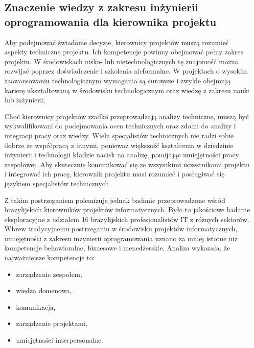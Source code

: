 \subsection{Znaczenie wiedzy z zakresu inżynierii oprogramowania dla kierownika projektu}
Aby podejmować świadome decyzje, kierownicy projektów muszą rozumieć aspekty techniczne projektu. Ich kompetencje powinny obejmować pełny zakres projektu. W środowiskach nisko- lub nietechnologicznych tę znajomość można rozwijać poprzez doświadczenie i szkolenia nieformalne. W projektach o wysokim zaawansowaniu technologicznym wymagania są surowsze i zwykle obejmują karierę ukształtowaną w środowisku technologicznym oraz wiedzę z zakresu nauki lub inżynierii.

Choć kierownicy projektów rzadko przeprowadzają analizy techniczne, muszą być wykwalifikowani do podejmowania ocen technicznych oraz zdolni do analizy i integracji pracy oraz wiedzy. Wielu specjalistów technicznych nie radzi sobie dobrze ze współpracą z innymi, ponieważ większość kształcenia w dziedzinie inżynierii i technologii kładzie nacisk na analizę, pomijając umiejętności pracy zespołowej. Aby skutecznie komunikować się ze wszystkimi uczestnikami projektu i integrować ich pracę, kierownik projektu musi rozumieć i posługiwać się językiem specjalistów technicznych.\autocite{NicholasSteyn}

Z takim postrzeganiem polemizuje jednak badanie przeprowadzone wśród brazylijskich kierowników projektów informatycznych.\autocite{silva2015project} Było to jakościowe badanie eksploracyjne z udziałem 16 brazylijskich profesjonalistów IT z różnych sektorów.
Wbrew tradycyjnemu postrzeganiu w środowisku projektów informatycznych, umiejętności z zakresu inżynierii oprogramowania uznano za mniej istotne niż kompetencje behawioralne, biznesowe i menedżerskie. Analiza wykazała, że najważniejsze kompetencje to:
\begin{itemize}
    \item zarządzanie zespołem,
    \item wiedza domenowa,
    \item komunikacja,
    \item zarządzanie projektami,
    \item umiejętności interpersonalne.
\end{itemize}
\autocite{silva2015project}

